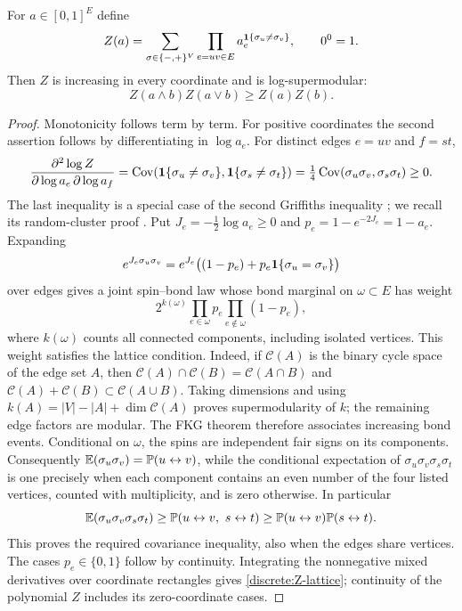 \begin{lemma}
\label{discrete:ising-partition}
For $a\in[0,1]^E$ define
\begin{equation}\label{discrete:ising-Z}
 Z(a)=\sum_{\sigma\in\{-,+\}^{V}}
             \prod_{e=uv\in E}a_e^{\mathbf 1\{\sigma_u\ne\sigma_v\}},
 \qquad 0^0=1.
\end{equation}
Then $Z$ is increasing in every coordinate and is log-supermodular:
\begin{equation}\label{discrete:Z-lattice}
 Z(a\wedge b)Z(a\vee b)\ge Z(a)Z(b).
\end{equation}
\end{lemma}
\begin{proof}
Monotonicity follows term by term.  For positive coordinates the second assertion follows by differentiating in $\log a_e$.
For distinct edges $e=uv$ and $f=st$,
\[
 \frac{\partial^2\log Z}{\partial\log a_e\,\partial\log a_f}
 =\operatorname{Cov}(\mathbf 1\{\sigma_u\ne\sigma_v\},
              \mathbf 1\{\sigma_s\ne\sigma_t\})
 =\tfrac14\operatorname{Cov}(\sigma_u\sigma_v,\sigma_s\sigma_t)\ge0.
\]
The last inequality is a special case of the second Griffiths inequality
\cite{GKS1968}; we recall its random-cluster proof \cite[p.~102]{FKG1971}. Put
$J_e=-\frac12\log a_e\ge0$ and $p_e=1-e^{-2J_e}=1-a_e$. Expanding
\[
 e^{J_e\sigma_u\sigma_v}
 =e^{J_e}\bigl((1-p_e)+p_e\mathbf 1\{\sigma_u=\sigma_v\}\bigr)
\]
over edges gives a joint spin--bond law whose bond marginal on
$\omega\subset E$ has weight
\[
 2^{k(\omega)}\prod_{e\in\omega}p_e
                    \prod_{e\notin\omega}(1-p_e),
\]
where $k(\omega)$ counts all connected components, including isolated
vertices. This weight satisfies the lattice condition. Indeed, if
$\mathcal C(A)$ is the binary cycle space of the edge set $A$, then
$\mathcal C(A)\cap\mathcal C(B)=\mathcal C(A\cap B)$ and
$\mathcal C(A)+\mathcal C(B)\subset\mathcal C(A\cup B)$.
Taking dimensions and using
$k(A)=|V|-|A|+\dim\mathcal C(A)$ proves supermodularity of $k$;
the remaining edge factors are modular. The FKG theorem
\cite{FKG1971} therefore associates increasing bond events.
Conditional on $\omega$, the spins are independent fair signs on its
components. Consequently
$\mathbb E(\sigma_u\sigma_v)=\mathbb P(u\leftrightarrow v)$, while the
conditional expectation of $\sigma_u\sigma_v\sigma_s\sigma_t$ is
one precisely when each component contains an even number of the four
listed vertices, counted with multiplicity, and is zero otherwise. In
particular
\[
 \mathbb E(\sigma_u\sigma_v\sigma_s\sigma_t)
 \ge\mathbb P(u\leftrightarrow v,\ s\leftrightarrow t)
 \ge\mathbb P(u\leftrightarrow v)\mathbb P(s\leftrightarrow t).
\]
This proves the required covariance inequality, also when the edges share
vertices. The cases $p_e\in\{0,1\}$ follow by continuity. Integrating
the nonnegative mixed derivatives over coordinate rectangles gives
\eqref{discrete:Z-lattice}; continuity of the polynomial $Z$ includes its
zero-coordinate cases.

\end{proof}


